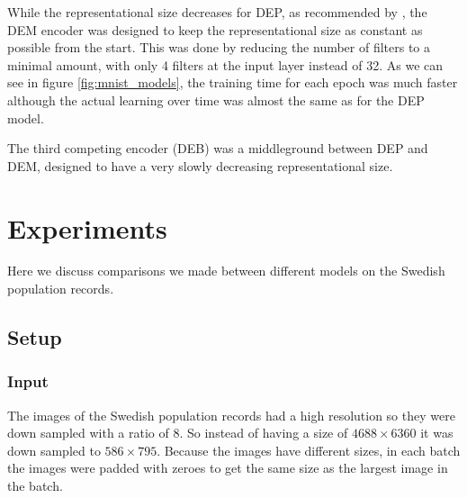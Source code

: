 While the representational size decreases for DEP, as recommended by \textcite{InceptionV3}, the DEM encoder was designed to keep the representational size as constant as possible from the start.
This was done by reducing the number of filters to a minimal amount, with only 4 filters at the input layer instead of 32.
As we can see in figure \ref{fig:mnist_models}, the training time for each epoch was much faster although the actual learning over time was almost the same as for the DEP model.

The third competing encoder (DEB) was a middleground between DEP and DEM, designed to have a very slowly decreasing representational size.










\section{Experiments}

Here we discuss comparisons we made between different models on the Swedish population records.

\subsection{Setup}


\subsubsection{Input}
The images of the Swedish population records had a high resolution so they were down sampled with a ratio of 8. So instead of having a size of $4688 \times 6360$ it was down sampled to $586 \times 795$. Because the images have different sizes, in each batch the images were padded with zeroes to get the same size as the largest image in the batch.

